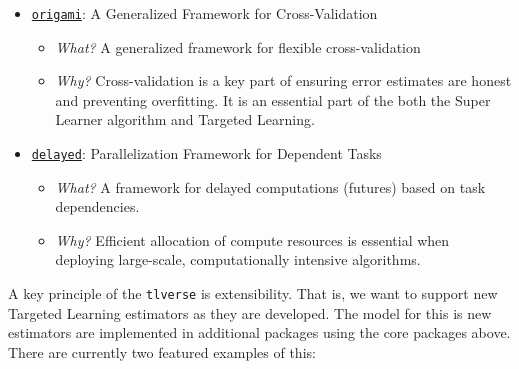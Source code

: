 \documentclass[12pt, krantz2,]{krantz}
\newcommand{\passthrough}[1]{#1}
\providecommand{\tightlist}{%
  \setlength{\itemsep}{0pt}\setlength{\parskip}{0pt}}
\theoremstyle{definition}
\theoremstyle{definition}
\theoremstyle{definition}
\newcommand{\1}{\mathbbm{1}}
\begin{document}
\begin{itemize}
\tightlist
\item
  \href{https://github.com/tlverse/origami}{\passthrough{\lstinline!origami!}}: A Generalized Framework for
  Cross-Validation

  \begin{itemize}
  \tightlist
  \item
    \emph{What?} A generalized framework for flexible cross-validation
  \item
    \emph{Why?} Cross-validation is a key part of ensuring error estimates are honest
    and preventing overfitting. It is an essential part of the both the Super
    Learner algorithm and Targeted Learning.
  \end{itemize}
\item
  \href{https://github.com/tlverse/delayed}{\passthrough{\lstinline!delayed!}}: Parallelization Framework for
  Dependent Tasks

  \begin{itemize}
  \tightlist
  \item
    \emph{What?} A framework for delayed computations (futures) based on task
    dependencies.
  \item
    \emph{Why?} Efficient allocation of compute resources is essential when deploying
    large-scale, computationally intensive algorithms.
  \end{itemize}
\end{itemize}

A key principle of the \passthrough{\lstinline!tlverse!} is extensibility. That is, we want to support
new Targeted Learning estimators as they are developed. The model for this is
new estimators are implemented in additional packages using the core packages
above. There are currently two featured examples of this:
\end{document}
